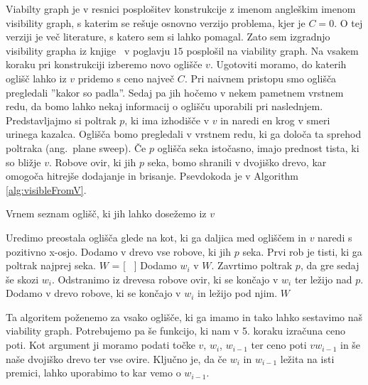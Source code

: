 \documentclass{article}
\begin{document}
Viabilty graph je v resnici posplošitev konstrukcije z imenom angleškim imenom visibility graph, s katerim se rešuje osnovno verzijo problema, kjer je $C = 0$. O tej verziji je več literature, s katero sem si lahko pomagal. Zato sem izgradnjo visibility grapha iz knjige~\cite{BCKO} v poglavju $15$ posplošil na viability graph. 
Na vsakem koraku pri konstrukciji izberemo novo oglišče $v$. Ugotoviti moramo, do katerih oglišč lahko iz $v$ pridemo s ceno največ $C$. Pri naivnem pristopu smo oglišča pregledali ''kakor so padla''. Sedaj pa jih hočemo v nekem pametnem vrstnem redu, da bomo lahko nekaj informacij o oglišču uporabili pri naslednjem. Predstavljajmo si poltrak $p$, ki ima izhodišče v $v$ in naredi en krog v smeri urinega kazalca. Oglišča bomo pregledali v vrstnem redu, ki ga določa ta sprehod poltraka (ang.\ plane sweep). Če $p$ oglišča seka istočasno, imajo prednost tista, ki so bližje $v$. Robove ovir, ki jih $p$ seka, bomo shranili v dvojiško drevo, kar omogoča hitrejše dodajanje in brisanje. Psevdokoda je v Algorithm \ref{alg:visibleFromV}.

\begin{algorithm}
    \caption{Vrnem seznam oglišč, ki jih lahko dosežemo iz $v$}
    \label{alg:visibleFromV}
    \begin{algorithmic}[1]
        \State Uredimo preostala oglišča glede na kot, ki ga daljica med ogliščem in $v$ naredi s pozitivno x-osjo.
        \State  Dodamo v drevo vse robove, ki jih $p$ seka. Prvi rob je tisti, ki ga poltrak najprej seka.
        \State $W$ = [ \ ]
            \State Dodamo $w_i$ v $W$.
        \EndIf
        \State Zavrtimo poltrak $p$, da gre sedaj še skozi $w_i$.
        \State Odstranimo iz drevesa robove ovir, ki se končajo v $w_i$ ter ležijo nad $p$.
        \State Dodamo v drevo robove, ki se končajo v $w_i$ in ležijo pod njim.
        \EndFor
        \State \Return $W$
    \end{algorithmic}
\end{algorithm}

Ta algoritem poženemo za vsako oglišče, ki ga imamo in tako lahko sestavimo naš viability graph. Potrebujemo pa še funkcijo, ki nam v 5. koraku izračuna ceno poti. Kot argument ji moramo podati točke $v$, $w_i$, $w_{i-1}$ ter ceno poti $vw_{i-1}$ in še naše dvojiško drevo ter vse ovire. Ključno je, da če $w_i$ in $w_{i-1}$ ležita na isti premici, lahko uporabimo to kar vemo o $w_{i-1}$.
\end{document}
